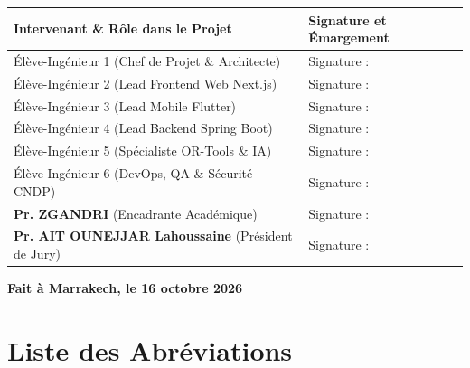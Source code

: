 \documentclass[11pt,a4paper]{report}
\begin{document}
\begin{table}[h!]
\centering
\renewcommand{\arraystretch}{1.6}
\begin{tabularx}{\textwidth}{|X|p{7cm}|}
\hline
\rowcolor{tableheader}
\textbf{Intervenant \& Rôle dans le Projet} & \textbf{Signature et Émargement} \\
\hline
Élève-Ingénieur 1 (Chef de Projet \& Architecte) & Signature : \dotfill \\
\hline
Élève-Ingénieur 2 (Lead Frontend Web Next.js) & Signature : \dotfill \\
\hline
Élève-Ingénieur 3 (Lead Mobile Flutter) & Signature : \dotfill \\
\hline
Élève-Ingénieur 4 (Lead Backend Spring Boot) & Signature : \dotfill \\
\hline
Élève-Ingénieur 5 (Spécialiste OR-Tools \& IA) & Signature : \dotfill \\
\hline
Élève-Ingénieur 6 (DevOps, QA \& Sécurité CNDP) & Signature : \dotfill \\
\hline
\rowcolor{tableheader}
\textbf{Pr. ZGANDRI} (Encadrante Académique) & Signature : \dotfill \\
\hline
\rowcolor{tableheader}
\textbf{Pr. AIT OUNEJJAR Lahoussaine} (Président de Jury) & Signature : \dotfill \\
\hline
\end{tabularx}
\end{table}

\vspace{1.2cm}
\begin{flushright}
    \textbf{Fait à Marrakech, le 16 octobre 2026}
\end{flushright}

\clearpage

\chapter*{Liste des Abréviations}
\end{document}
